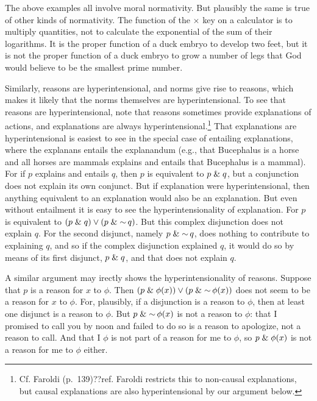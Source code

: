 The above examples all involve moral normativity. But plausibly the same is true of other kinds of normativity. The function of the
$\times$ key on a calculator is to multiply quantities, not to calculate the exponential of the sum of their logarithms. It is 
the proper function of a duck embryo to develop two feet, but  it is not the proper function of a duck embryo to grow a
number of legs that God would believe to be the smallest prime number.

Similarly, reasons are hyperintensional, and norms give rise to reasons, which makes it likely that the norms themselves are
hyperintensional. To see that reasons are hyperintensional, note that reasons sometimes provide explanations of actions, and 
explanations are always hyperintensional.\footnote{Cf. Faroldi (p.~139)??ref. Faroldi restricts this to non-causal explanations, but
causal explanations are also hyperintensional by our argument below.}
 That explanations are hyperintensional is easiest to see in the special case of entailing
explanations, where the explanans entails the explanandum (e.g., that Bucephalus is a horse and all horses are mammals explains
and entails that Bucephalus is a mammal). For if $p$ explains and entails $q$, then $p$ is equivalent to $p\mathrel{\&} q$, but a 
conjunction does not explain its own conjunct. But if explanation were hyperintensional, then anything equivalent to an 
explanation would also be an explanation. But even without entailment it is easy to see the hyperintensionality of
explanation. For $p$ is equivalent to $(p\mathrel{\&} q)\vee (p\mathrel{\&}\operatorname{\sim} q)$. But this complex disjunction does not explain $q$. 
For the second disjunct, namely $p\mathrel{\&}\operatorname{\sim} q$, does nothing to contribute to explaining $q$, and so if the complex disjunction 
explained $q$, it would do so by means of its first disjunct, $p\mathrel{\&} q$, and that does not explain $q$. 

A similar argument may irectly shows the hyperintensionality of reasons. Suppose that $p$ is a reason for $x$ to $\phi$. Then 
$(p\mathrel{\&} \phi(x))\vee (p\mathrel{\&} \operatorname{\sim}\phi(x))$ does not seem to be a reason for $x$ to $\phi$. For, plausibly, if a disjunction is a 
reason to $\phi$, then at least one disjunct is a reason to $\phi$. But $p\mathrel{\&} \operatorname{\sim}\phi(x)$ is not a reason to $\phi$: that I
promised to call you by noon and failed to do so is a reason to apologize, not a reason to call. And that I $\phi$ is not 
part of a reason for me to $\phi$, so $p\mathrel{\&}\phi(x)$ is not a reason for me to $\phi$ either.

